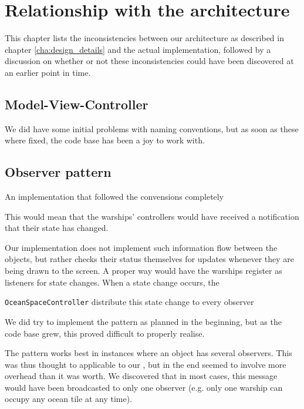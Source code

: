 \chapter{Relationship with the architecture}
\label{cha:relationship_with_the_architecture}

This chapter lists the inconsistencies between our architecture as described in chapter \ref{cha:design_details} and the actual implementation, followed by a discussion on whether or not these inconsistencies could have been discovered at an earlier point in time.





\section{Model-View-Controller}



We did have some initial problems with naming conventions, but as soon as these where fixed, the code base has been a joy to work with.



\section{Observer pattern}

An implementation that followed the convensions completely

This would mean that the warships' controllers would have received a notification that their state has changed.

Our implementation does not implement such information flow between the objects, but rather checks their status themselves for updates whenever they are being drawn to the screen.
A proper way would have the warships register as listeners for state changes. When a state change occurs, the 

\texttt{OceanSpaceController} distribute this state change to every observer

We did try to implement the pattern as planned in the beginning, but as the code base grew, this proved difficult to properly realise.

The pattern works best in instances where an object has several observers. This was thus thought to applicable to our 
, but in the end seemed to involve more overhead than it was worth. We discovered that in most cases, this message would have been broadcasted to only one observer (e.g. only one warship can occupy any ocean tile at any time).

